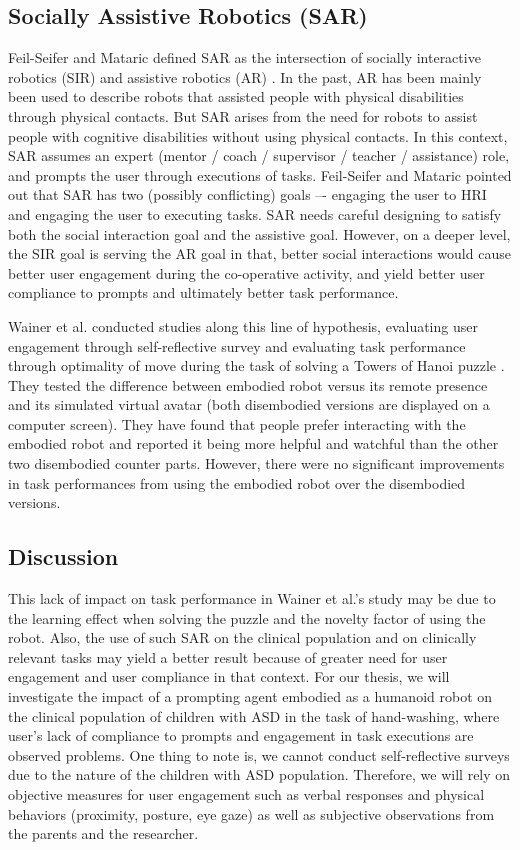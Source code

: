 \documentclass{ut-thesis}
\begin{document}
\subsection{Socially Assistive Robotics (SAR)}
Feil-Seifer and Mataric defined SAR as the intersection of socially interactive robotics (SIR) and assistive robotics (AR) \cite{feil2005defining}.  In the past, AR has been mainly been used to describe robots that assisted people with physical disabilities through physical contacts.  But SAR arises from the need for robots to assist people with cognitive disabilities without using physical contacts.  In this context, SAR assumes an expert (mentor / coach / supervisor / teacher / assistance) role, and prompts the user through executions of tasks.  Feil-Seifer and Mataric pointed out that SAR has two (possibly conflicting) goals –- engaging the user to HRI and engaging the user to executing tasks.  SAR needs careful designing to satisfy both the social interaction goal and the assistive goal.  However, on a deeper level, the SIR goal is serving the AR goal in that, better social interactions would cause better user engagement during the co-operative activity, and yield better user compliance to prompts and ultimately better task performance.


Wainer et al. conducted studies along this line of hypothesis, evaluating user engagement through self-reflective survey and evaluating task performance through optimality of move during the task of solving a Towers of Hanoi puzzle \cite{wainer2007embodiment}.  They tested the difference between embodied robot versus its remote presence and its simulated virtual avatar (both disembodied versions are displayed on a computer screen).  They have found that people prefer interacting with the embodied robot and reported it being more helpful and watchful than the other two disembodied counter parts.  However, there were no significant improvements in task performances from using the embodied robot over the disembodied versions.


\subsection{Discussion}
This lack of impact on task performance in Wainer et al.'s study may be due to the learning effect when solving the puzzle and the novelty factor of using the robot.  Also, the use of such SAR on the clinical population and on clinically relevant tasks may yield a better result because of greater need for user engagement and user compliance in that context.  For our thesis, we will investigate the impact of a prompting agent embodied as a humanoid robot on the clinical population of children with ASD in the task of hand-washing, where user's lack of compliance to prompts and engagement in task executions are observed problems.  One thing to note is, we cannot conduct self-reflective surveys due to the nature of the children with ASD population.  Therefore, we will rely on objective measures for user engagement such as verbal responses and physical behaviors (proximity, posture, eye gaze) \cite{mataric2005role} as well as subjective observations from the parents and the researcher.
\end{document}
